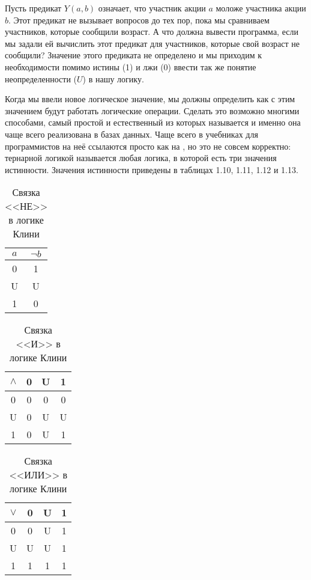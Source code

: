 Пусть предикат $Y(a, b)$ означает, что участник акции $a$ моложе участника акции $b$. Этот предикат не вызывает вопросов до тех пор, пока мы сравниваем участников, которые сообщили возраст. А что должна вывести программа, если мы задали ей вычислить этот предикат для участников, которые свой возраст не сообщили? Значение этого предиката не определено и мы приходим к необходимости помимо истины (1) и лжи (0) ввести так же понятие неопределенности ($U$) в нашу логику.

Когда мы ввели новое логическое значение, мы должны определить как с этим значением будут работать логические операции. Сделать это возможно многими способами, самый простой и естественный из которых называется  и именно она чаще всего реализована в базах данных. Чаще всего в учебниках для программистов на неё ссылаются просто как на , но это не совсем корректно: тернарной логикой называется любая логика, в которой есть три значения истинности. Значения истинности приведены в таблицах 1.10, 1.11, 1.12 и 1.13.

\begin{table}[h]
\centering
\begin{tabular}{c | c}
$a$ & $\neg b$ \\
\hline
0 & 1 \\
U & U\\
1 & 0
\end{tabular}
\caption{Связка <<НЕ>> в логике Клини}\label{table:kleene-not}
\end{table}

\begin{table}[h]
\centering
\begin{tabular}{c | c c c}
$\land$ & 0 &U &1 \\
\hline
0 & 0 & 0 & 0 \\
U & 0 & U & U\\
1 & 0 & U & 1
\end{tabular}
\caption{Связка <<И>> в логике Клини}\label{table:kleene-and}
\end{table}

\begin{table}[h]
\centering
\begin{tabular}{c | c c c}
$\lor$ & 0 &U &1 \\
\hline
0 & 0 & U & 1 \\
U & U & U & 1\\
1 & 1 & 1 & 1
\end{tabular}
\caption{Связка <<ИЛИ>> в логике Клини}\label{table:kleene-or}
\end{table}

